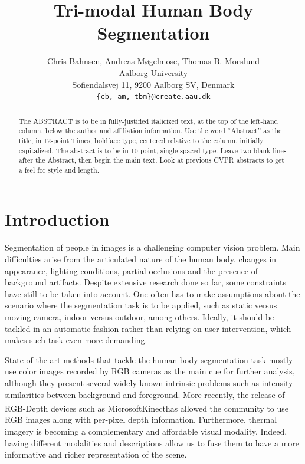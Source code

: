 \documentclass[10pt,twocolumn,letterpaper]{article}
\begin{document}
\title{Tri-modal Human Body Segmentation}

\author{Chris Bahnsen, Andreas Møgelmose, Thomas B. Moeslund\\
Aalborg University\\
Sofiendalsvej 11, 9200 Aalborg SV, Denmark\\
{\tt\small \{cb, am, tbm\}@create.aau.dk}
}

\maketitle

\begin{abstract}
   The ABSTRACT is to be in fully-justified italicized text, at the top
   of the left-hand column, below the author and affiliation
   information. Use the word ``Abstract'' as the title, in 12-point
   Times, boldface type, centered relative to the column, initially
   capitalized. The abstract is to be in 10-point, single-spaced type.
   Leave two blank lines after the Abstract, then begin the main text.
   Look at previous CVPR abstracts to get a feel for style and length.
\end{abstract}

\section{Introduction}
\label{sec:introduction}
Segmentation of people in images is a challenging computer vision problem. Main difficulties arise from the articulated nature of the human body, changes in appearance, lighting conditions, partial occlusions and the presence of background artifacts. Despite extensive research done so far, some constraints have still to be taken into account. One often has to make assumptions about the scenario where the segmentation task is to be applied, such as static versus moving camera, indoor versus outdoor, among others. Ideally, it should be tackled in an automatic fashion rather than relying on user intervention, which makes such task even more demanding. 

State-of-the-art methods that tackle the human body segmentation task mostly use color images recorded by RGB cameras as the main cue for further analysis, although they present several widely known intrinsic problems such as intensity similarities between background and foreground. More recently, the release of RGB-Depth devices such as Microsoft\textsuperscript\textregistered Kinect\textsuperscript\texttrademark has allowed the community to use RGB images along with per-pixel depth information. Furthermore, thermal imagery is becoming a complementary and affordable visual modality. Indeed, having different modalities and descriptions allow us to fuse them to have a more informative and richer representation of the scene. 
\end{document}

